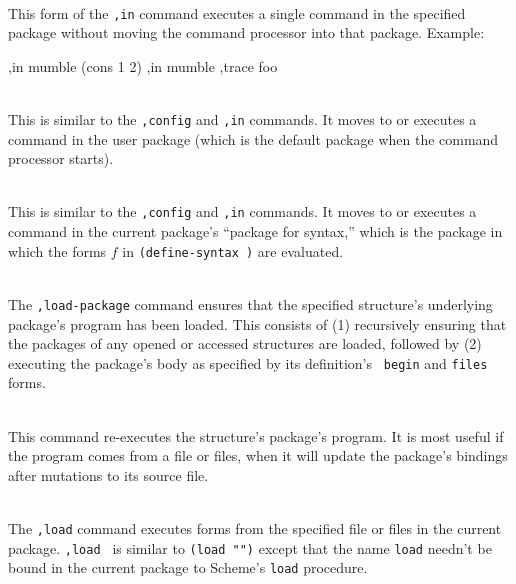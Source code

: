 \begin{description}
\item {} \\
    This form of the {\tt,in} command executes a single command in the
    specified package without moving the command processor into that
    package.  Example:
\begin{example}
,in mumble (cons 1 2)
,in mumble ,trace foo
\end{example}

\item {} \\
    This is similar to the {\tt ,config} and {\tt ,in} commands.  It
    moves to or executes a command in the user package (which is the
    default package when the \hack{} command processor starts).

\item {} \\
    This is similar to the {\tt ,config} and {\tt ,in} commands.  It
    moves to or executes a command in the current package's ``package
    for syntax,'' which is the package in which the forms $f$ in
    {\tt (define-syntax  )} are evaluated.

\item {} \\
    The {\tt,load-package} command ensures that the specified structure's
    underlying package's program has been loaded.  This 
    consists of (1) recursively ensuring that the packages of any
    opened or accessed structures are loaded, followed by (2)
    executing the package's body as specified by its definition's {\tt
    begin} and {\tt files} forms.

\item {} \\
    This command re-executes the structure's package's program.  It
    is most useful if the program comes from a file or files, when
    it will update the package's bindings after mutations to its
    source file.

\item {} \\
    The {\tt,load} command executes forms from the specified file or
    files in the current package.  {\tt,load } is similar
    to {\tt(load "")}
    except that the name {\tt load} needn't be bound in the current
    package to Scheme's {\tt load} procedure.


\end{description}
